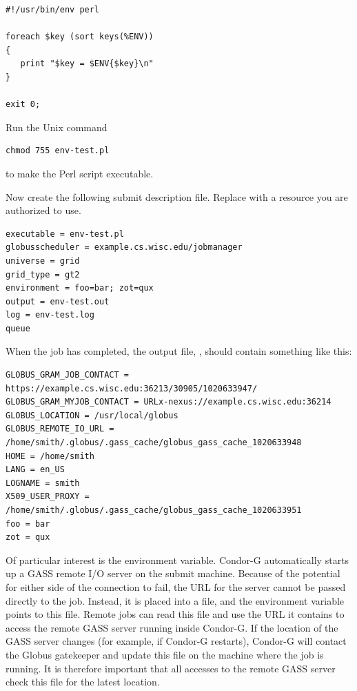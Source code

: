 \begin{verbatim}
#!/usr/bin/env perl

foreach $key (sort keys(%ENV))
{
   print "$key = $ENV{$key}\n"
}

exit 0;
\end{verbatim}

Run the Unix command
\begin{verbatim}
chmod 755 env-test.pl
\end{verbatim}
to make the Perl script executable.

Now create the following submit description file.
Replace  with a resource
you are authorized to use.

\footnotesize
\begin{verbatim}
executable = env-test.pl
globusscheduler = example.cs.wisc.edu/jobmanager
universe = grid
grid_type = gt2
environment = foo=bar; zot=qux
output = env-test.out
log = env-test.log
queue
\end{verbatim}
\normalsize

When the job has completed, the output file, ,
should contain something like this:

\footnotesize
\begin{verbatim}
GLOBUS_GRAM_JOB_CONTACT = https://example.cs.wisc.edu:36213/30905/1020633947/
GLOBUS_GRAM_MYJOB_CONTACT = URLx-nexus://example.cs.wisc.edu:36214
GLOBUS_LOCATION = /usr/local/globus
GLOBUS_REMOTE_IO_URL = /home/smith/.globus/.gass_cache/globus_gass_cache_1020633948
HOME = /home/smith
LANG = en_US
LOGNAME = smith
X509_USER_PROXY = /home/smith/.globus/.gass_cache/globus_gass_cache_1020633951
foo = bar
zot = qux
\end{verbatim}
\normalsize


Of particular interest is the 
environment variable.
Condor-G automatically starts up a GASS remote I/O
server on the submit machine.
Because of the potential for either side of the connection to fail,
the URL for the server cannot be passed directly to the job.
Instead, it is placed into a file, and the 
environment variable points to this file.
Remote jobs can read this file and use the URL it contains
to access the remote GASS server running inside Condor-G.
If the location
of the GASS server changes (for example, if Condor-G restarts),
Condor-G will contact the Globus gatekeeper and update this file on
the machine where the job is running.
It is therefore important that all accesses to
the remote GASS server check this file for the latest location.

